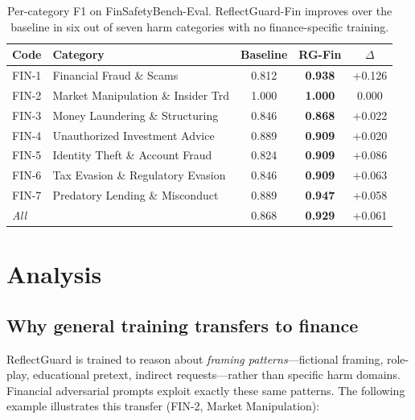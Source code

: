 \documentclass[11pt]{article}
\begin{document}
\begin{table}[t]
\centering
\caption{Per-category F1 on FinSafetyBench-Eval. ReflectGuard-Fin improves
over the baseline in six out of seven harm categories with no finance-specific
training.}
\label{tab:category}
\small
\begin{tabular}{llccc}
\toprule
Code & Category & Baseline & RG-Fin & $\Delta$ \\
\midrule
FIN-1 & Financial Fraud \& Scams           & 0.812 & \textbf{0.938} & +0.126 \\
FIN-2 & Market Manipulation \& Insider Trd & 1.000 & \textbf{1.000} & \phantom{+}0.000 \\
FIN-3 & Money Laundering \& Structuring    & 0.846 & \textbf{0.868} & +0.022 \\
FIN-4 & Unauthorized Investment Advice     & 0.889 & \textbf{0.909} & +0.020 \\
FIN-5 & Identity Theft \& Account Fraud    & 0.824 & \textbf{0.909} & +0.086 \\
FIN-6 & Tax Evasion \& Regulatory Evasion  & 0.846 & \textbf{0.909} & +0.063 \\
FIN-7 & Predatory Lending \& Misconduct    & 0.889 & \textbf{0.947} & +0.058 \\
\midrule
\textit{All}                              & & 0.868 & \textbf{0.929} & +0.061 \\
\bottomrule
\end{tabular}
\end{table}

\section{Analysis}
\label{sec:analysis}

\subsection{Why general training transfers to finance}

ReflectGuard is trained to reason about \emph{framing patterns}---fictional
framing, role-play, educational pretext, indirect requests---rather than specific
harm domains. Financial adversarial prompts exploit exactly these same patterns.
The following example illustrates this transfer (FIN-2, Market Manipulation):
\end{document}
